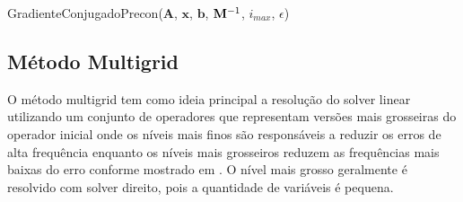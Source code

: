 \vspace{1cm}
\begin{algorithm}[H]
\caption{GradienteConjugadoPrecon($\mathbf{A}$, $\mathbf{x}$, $\mathbf{b}$, $\mathbf{M}^{-1}$, $i_{max}$, $\epsilon$)}
\label{alg:algoritmocgprecon}
\end{algorithm}
\vspace{1cm}


\subsection{Método Multigrid}

O método multigrid tem como ideia principal a resolução do solver linear utilizando um conjunto de operadores que representam versões mais grosseiras do operador inicial onde os níveis mais finos são responsáveis a reduzir os erros de alta frequência enquanto os níveis mais grosseiros reduzem as frequências mais baixas do erro conforme mostrado em \citet{multigridtutorial}. O nível mais grosso geralmente é resolvido com solver direito, pois a quantidade de variáveis é pequena. 

